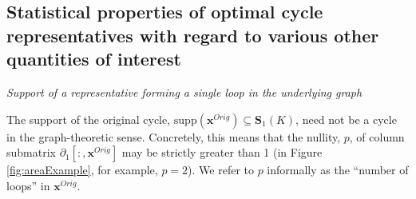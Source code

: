 \documentclass[11pt,onecolumn]{article}
\newcommand{\Simplices}[0]{\mathbf{S}}
\newcommand{\originalrep}{\mathbf{x}^{Orig}}
\newcommand{\optimalrep}{\mathbf{x}}
\newcommand{\fig}{Figure }
\newcommand{\supp}{\mathrm{supp}}
\theoremstyle{plain}
\theoremstyle{definition}
\newcommand{\GHP}[1]{{\textcolor{purple}{\small {\sf [[GHP: #1]]}}}}
\begin{document}
\subsection{Statistical properties of optimal cycle representatives with regard to various other quantities of interest}


\vspace{0.1in}
\noindent \emph{Support of a representative forming a single loop in the underlying graph}

The support of the original cycle, $\supp(\originalrep) \subseteq \Simplices_1(K)$, need not be a cycle in the graph-theoretic sense.  Concretely, this means that the nullity, $p$, of column submatrix $\partial_1[:,\originalrep]$ may be strictly greater than 1 (in \fig \ref{fig:areaExample}, for example, $p=2$).  We refer to $p$ informally as the ``number of loops'' in $\originalrep$. 

\end{document}
